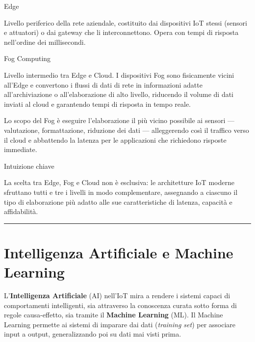 \documentclass[
  italian,
  openany]{book}
\begin{document}
\begin{calloutdefinition}{Edge}

Livello periferico della rete aziendale, costituito dai dispositivi IoT
stessi (sensori e attuatori) o dai gateway che li interconnettono. Opera
con tempi di risposta nell'ordine dei millisecondi.

\end{calloutdefinition}

\begin{calloutdefinition}{Fog Computing}

Livello intermedio tra Edge e Cloud. I dispositivi Fog sono fisicamente
vicini all'Edge e convertono i flussi di dati di rete in informazioni
adatte all'archiviazione o all'elaborazione di alto livello, riducendo
il volume di dati inviati al cloud e garantendo tempi di risposta in
tempo reale.

\end{calloutdefinition}

Lo scopo del Fog è eseguire l'elaborazione il più vicino possibile ai
sensori --- valutazione, formattazione, riduzione dei dati ---
alleggerendo così il traffico verso il cloud e abbattendo la latenza per
le applicazioni che richiedono risposte immediate.

\begin{callouttip}{Intuizione chiave}

La scelta tra Edge, Fog e Cloud non è esclusiva: le architetture IoT
moderne sfruttano tutti e tre i livelli in modo complementare,
assegnando a ciascuno il tipo di elaborazione più adatto alle sue
caratteristiche di latenza, capacità e affidabilità.

\end{callouttip}

\begin{center}\rule{0.5\linewidth}{0.5pt}\end{center}

\section{Intelligenza Artificiale e Machine
Learning}\label{intelligenza-artificiale-e-machine-learning}

L'\textbf{Intelligenza Artificiale} (AI) nell'IoT mira a rendere i
sistemi capaci di comportamenti intelligenti, sia attraverso la
conoscenza curata sotto forma di regole causa-effetto, sia tramite il
\textbf{Machine Learning} (ML). Il Machine Learning permette ai sistemi
di imparare dai dati (\emph{training set}) per associare input a output,
generalizzando poi su dati mai visti prima.
\end{document}
